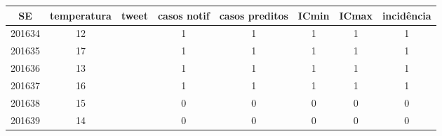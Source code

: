 \begin{tabular}{c|ccccccc}
  \hline
SE & temperatura & tweet & casos notif & casos preditos & ICmin & ICmax & incidência \\ 
  \hline
201634 & 12 &  & 1 & 1 & 1 & 1 & 1 \\ 
  201635 & 17 &  & 1 & 1 & 1 & 1 & 1 \\ 
  201636 & 13 &  & 1 & 1 & 1 & 1 & 1 \\ 
  201637 & 16 &  & 1 & 1 & 1 & 1 & 1 \\ 
  201638 & 15 &  & 0 & 0 & 0 & 0 & 0 \\ 
  201639 & 14 &  & 0 & 0 & 0 & 0 & 0 \\ 
   \hline
\end{tabular}
